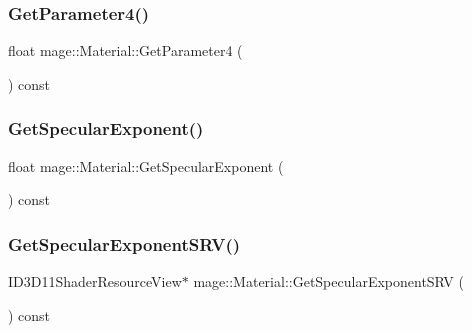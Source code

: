 \subsubsection{\texorpdfstring{Get\+Parameter4()}{GetParameter4()}}
{\footnotesize\ttfamily float mage\+::\+Material\+::\+Get\+Parameter4 (\begin{DoxyParamCaption}{ }\end{DoxyParamCaption}) const\hspace{0.3cm}{\ttfamily [noexcept]}}

\hypertarget{structmage_1_1_material_a48afb440024e4e2e45a81ce2b46c0d73}{}\label{structmage_1_1_material_a48afb440024e4e2e45a81ce2b46c0d73} 
\subsubsection{\texorpdfstring{Get\+Specular\+Exponent()}{GetSpecularExponent()}}
{\footnotesize\ttfamily float mage\+::\+Material\+::\+Get\+Specular\+Exponent (\begin{DoxyParamCaption}{ }\end{DoxyParamCaption}) const\hspace{0.3cm}{\ttfamily [noexcept]}}

\hypertarget{structmage_1_1_material_aca8740404b0e52c781dd1c02ec167539}{}\label{structmage_1_1_material_aca8740404b0e52c781dd1c02ec167539} 
\subsubsection{\texorpdfstring{Get\+Specular\+Exponent\+S\+R\+V()}{GetSpecularExponentSRV()}}
{\footnotesize\ttfamily I\+D3\+D11\+Shader\+Resource\+View$\ast$ mage\+::\+Material\+::\+Get\+Specular\+Exponent\+S\+RV (\begin{DoxyParamCaption}{ }\end{DoxyParamCaption}) const\hspace{0.3cm}{\ttfamily [noexcept]}}

\hypertarget{structmage_1_1_material_a57a083f7769c5d6501282d66b6733b10}{}\label{structmage_1_1_material_a57a083f7769c5d6501282d66b6733b10} 
